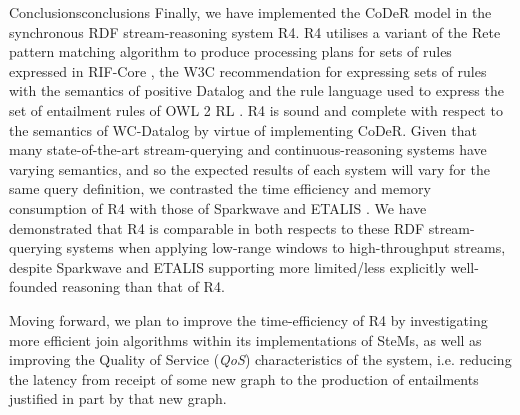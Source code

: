 \begin{nestedsection}{Conclusions}{conclusions}
	Finally, we have implemented the CoDeR model in the synchronous RDF stream-reasoning system R4.
	R4 utilises a variant of the Rete pattern matching algorithm \citep{forgy79} to produce processing plans for sets of rules expressed in RIF-Core \citep{w3crifcore}, the W3C recommendation for expressing sets of rules with the semantics of positive Datalog and the rule language used to express the set of entailment rules of OWL 2 RL \citep{w3cowl2profiles}.
	R4 is sound and complete with respect to the semantics of WC-Datalog by virtue of implementing CoDeR.
	Given that many state-of-the-art stream-querying and continuous-reasoning systems have varying semantics, and so the expected results of each system will vary for the same query definition, we contrasted the time efficiency and memory consumption of R4 with those of Sparkwave \citep{sparkwave} and ETALIS \citep{EP-SPARQL}.
	We have demonstrated that R4 is comparable in both respects to these RDF stream-querying systems when applying low-range windows to high-throughput streams, despite Sparkwave and ETALIS supporting more limited/less explicitly well-founded reasoning than that of R4.

	Moving forward, we plan to improve the time-efficiency of R4 by investigating more efficient join algorithms within its implementations of SteMs, as well as improving the Quality of Service (\emph{QoS}) characteristics of the system, i.e. reducing the latency from receipt of some new graph to the production of entailments justified in part by that new graph.
\end{nestedsection}
